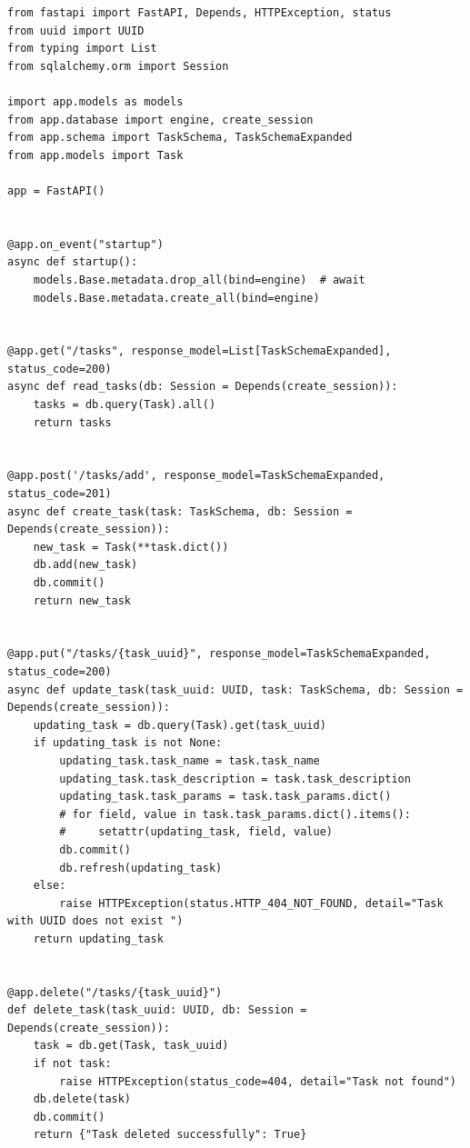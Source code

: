 \documentclass{altsu-report}
\begin{document}
\begin{code}
\label{code:pi-example}
\begin{verbatim}
from fastapi import FastAPI, Depends, HTTPException, status
from uuid import UUID
from typing import List
from sqlalchemy.orm import Session

import app.models as models
from app.database import engine, create_session
from app.schema import TaskSchema, TaskSchemaExpanded
from app.models import Task

app = FastAPI()


@app.on_event("startup")
async def startup():
    models.Base.metadata.drop_all(bind=engine)  # await
    models.Base.metadata.create_all(bind=engine)


@app.get("/tasks", response_model=List[TaskSchemaExpanded], status_code=200)
async def read_tasks(db: Session = Depends(create_session)):
    tasks = db.query(Task).all()
    return tasks


@app.post('/tasks/add', response_model=TaskSchemaExpanded, status_code=201)
async def create_task(task: TaskSchema, db: Session = Depends(create_session)):
    new_task = Task(**task.dict())
    db.add(new_task)
    db.commit()
    return new_task


@app.put("/tasks/{task_uuid}", response_model=TaskSchemaExpanded, status_code=200)
async def update_task(task_uuid: UUID, task: TaskSchema, db: Session = Depends(create_session)):
    updating_task = db.query(Task).get(task_uuid)
    if updating_task is not None:
        updating_task.task_name = task.task_name
        updating_task.task_description = task.task_description
        updating_task.task_params = task.task_params.dict()
        # for field, value in task.task_params.dict().items():
        #     setattr(updating_task, field, value)
        db.commit()
        db.refresh(updating_task)
    else:
        raise HTTPException(status.HTTP_404_NOT_FOUND, detail="Task with UUID does not exist ")
    return updating_task


@app.delete("/tasks/{task_uuid}")
def delete_task(task_uuid: UUID, db: Session = Depends(create_session)):
    task = db.get(Task, task_uuid)
    if not task:
        raise HTTPException(status_code=404, detail="Task not found")
    db.delete(task)
    db.commit()
    return {"Task deleted successfully": True}

\end{verbatim}
\end{code}
\end{document}
